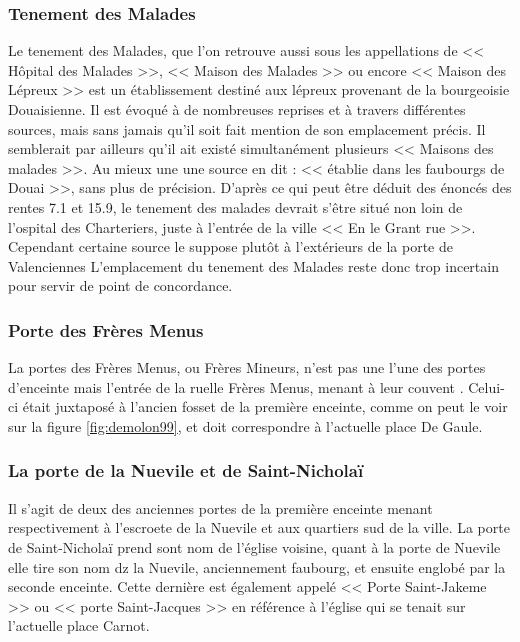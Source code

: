\subsubsection{Tenement des Malades}
Le tenement des Malades, que l'on retrouve aussi sous les appellations  de << Hôpital des Malades >>, <<  Maison des Malades >> ou encore << Maison des Lépreux >> est un établissement destiné aux lépreux provenant de la bourgeoisie Douaisienne. Il est évoqué à de nombreuses reprises et à travers différentes sources, mais sans jamais qu'il soit fait mention de son emplacement précis. Il semblerait par ailleurs qu'il ait existé simultanément plusieurs << Maisons des malades >>. Au mieux une une source en dit : << établie dans les faubourgs de Douai >>, sans plus de précision.
D'après ce qui peut être déduit des énoncés des rentes 7.1 et 15.9,  le tenement des malades devrait s'être situé non loin de l'ospital des Charteriers, juste à  l'entrée de la ville  << En le Grant rue >>.  Cependant certaine source le suppose plutôt à l'extérieurs de la porte de Valenciennes \parencite{brassart_notes_1842}
L'emplacement du tenement des Malades reste donc trop incertain pour servir de point de concordance.

\subsubsection{Porte des Frères Menus}
La portes des Frères Menus, ou Frères Mineurs, n'est pas une l'une des portes d'enceinte mais l'entrée de la ruelle Frères Menus, menant à leur couvent \parencite{duthilloeul_douai_1864}. Celui-ci était juxtaposé à l'ancien fosset de la première enceinte, comme on peut le voir sur la figure \ref{fig:demolon99}, et doit correspondre à l'actuelle place De Gaule. 

\subsubsection{La porte de la Nuevile et de Saint-Nicholaï}
Il s'agit de deux des anciennes portes de la première enceinte menant respectivement à l'escroete de la Nuevile et aux quartiers sud  de la ville. La porte de Saint-Nicholaï prend sont nom de l'église voisine, quant à la porte de Nuevile elle tire son nom dz la Nuevile, anciennement faubourg, et ensuite englobé par la seconde enceinte. Cette dernière est également appelé << Porte Saint-Jakeme >> ou << porte Saint-Jacques >> en référence à l'église  qui se tenait sur l'actuelle place Carnot.

